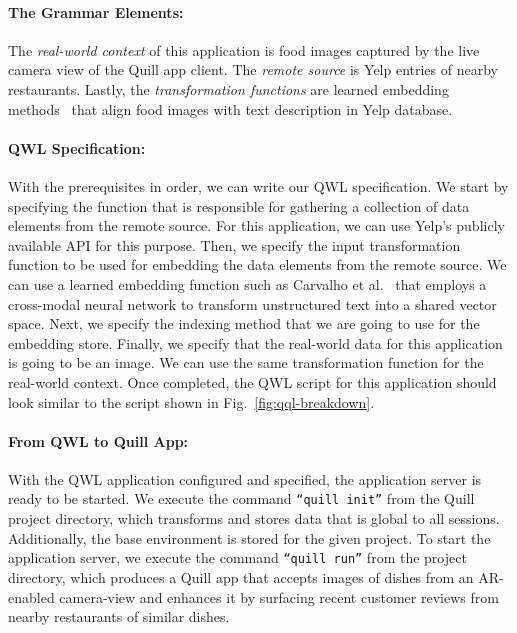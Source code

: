 \documentclass[11pt]{article}
\begin{document}
\paragraph{The Grammar Elements:}
The \emph{real-world context} of this application is food images captured by the live camera view of the Quill app client. The \emph{remote source} is Yelp entries of nearby restaurants. Lastly, the \emph{transformation functions} are learned embedding methods~\cite{carvalho2018cross} that align food images with text description in Yelp database.

\paragraph{QWL Specification:}
\label{sec:applications:menu:qql}
With the prerequisites in order, we can write our QWL specification. We start by specifying the function that is responsible for gathering a collection of data elements from the remote source. For this application, we can use Yelp's publicly available API for this purpose. Then, we specify the input transformation function to be used for embedding the data elements from the remote source. We can use a learned embedding function such as Carvalho et al.~\cite{carvalho2018cross} that employs a cross-modal neural network to transform unstructured text into a shared vector space. Next, we specify the indexing method that we are going to use for the embedding store. Finally, we specify that the real-world data for this application is going to be an image. We can use the same transformation function for the real-world context. Once completed, the QWL script for this application should look similar to the script shown in Fig.~\ref{fig:qql-breakdown}. 

\paragraph{From QWL to Quill App:}
With the QWL application configured and specified, the application server is ready to be started.
We execute the command \texttt{``quill init''} from the Quill project directory, which transforms and stores data that is global to all sessions. Additionally, the base environment is stored for the given project. To start the application server, we execute the command \texttt{``quill run''} from the project directory, which produces a Quill app that accepts images of dishes from an AR-enabled camera-view and enhances it by surfacing recent customer reviews from nearby restaurants of similar dishes.
\end{document}
